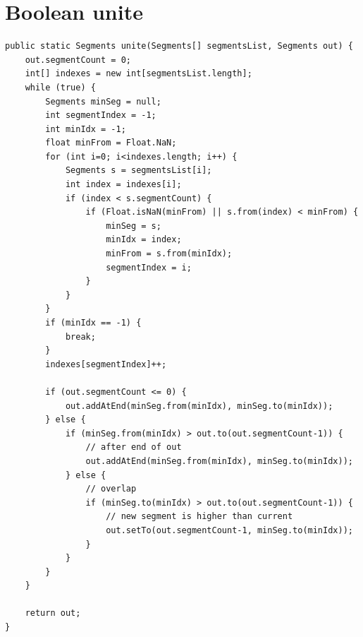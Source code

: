 \documentclass[11pt,twoside,a4paper]{report}
\begin{document}
\section{Boolean unite}
\label{source:unite}
\begin{lstlisting}
public static Segments unite(Segments[] segmentsList, Segments out) {
    out.segmentCount = 0;
    int[] indexes = new int[segmentsList.length];
    while (true) {
        Segments minSeg = null;
        int segmentIndex = -1;
        int minIdx = -1;
        float minFrom = Float.NaN;
        for (int i=0; i<indexes.length; i++) {
            Segments s = segmentsList[i];
            int index = indexes[i];
            if (index < s.segmentCount) {
                if (Float.isNaN(minFrom) || s.from(index) < minFrom) {
                    minSeg = s;
                    minIdx = index;
                    minFrom = s.from(minIdx);
                    segmentIndex = i;
                }
            }
        }
        if (minIdx == -1) {
            break;
        }
        indexes[segmentIndex]++;

        if (out.segmentCount <= 0) {
            out.addAtEnd(minSeg.from(minIdx), minSeg.to(minIdx));
        } else {
            if (minSeg.from(minIdx) > out.to(out.segmentCount-1)) {
                // after end of out
                out.addAtEnd(minSeg.from(minIdx), minSeg.to(minIdx));
            } else {
                // overlap
                if (minSeg.to(minIdx) > out.to(out.segmentCount-1)) {
                    // new segment is higher than current
                    out.setTo(out.segmentCount-1, minSeg.to(minIdx));
                }
            }
        }
    }

    return out;
}
\end{lstlisting}
\end{document}
